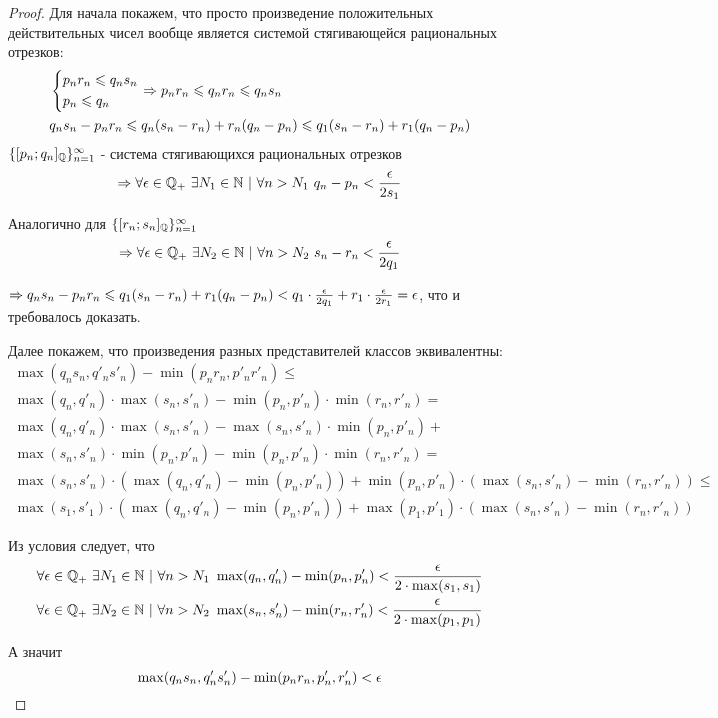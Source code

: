 \begin{proof}
    Для начала покажем, что просто произведение положительных действительных чисел вообще является системой стягивающейся рациональных отрезков:
    \begin{align*}
        &\left\{\begin{aligned}
        &p_n r_n \leqslant q_n s_n \\ 
        &p_n \leqslant q_n
        \end{aligned}\right. 
        \Rightarrow p_n r_n \leqslant q_n r_n \leqslant q_n s_n \\
        &q_n s_n - p_n r_n \leqslant q_n (s_n - r_n) + r_n (q_n - p_n) \leqslant q_1 (s_n - r_n) + r_1 (q_n - p_n)
    \end{align*}
    $\{[p_n; q_n]_{\mathbb{Q}}\}_{n = 1}^\infty$ - система стягивающихся рациональных отрезков
    $$
    \Ra \forall \veps \in \Q_+\ \exists N_1 \in \N\ |\ \forall n > N_1\ q_n - p_n < \frac{\veps}{2s_1}
    $$
    
    Аналогично для $\{[r_n; s_n]_{\mathbb{Q}}\}_{n = 1}^\infty$
    $$
    \Rightarrow \forall \epsilon \in \mathbb{Q}_+\ \exists N_2 \in \mathbb{N}\ |\ \forall n > N_2\ s_n - r_n < \frac{\epsilon}{2q_1}
    $$
    
    $\Rightarrow q_n s_n - p_n r_n \leqslant q_1 (s_n - r_n) + r_1 (q_n - p_n) < q_1 \cdot \frac{\epsilon}{2q_1} + r_1 \cdot \frac{\epsilon}{2r_1} = \epsilon$, что и требовалось доказать.
    
    Далее покажем, что произведения разных представителей классов эквивалентны:
    \begin{multline}
        \max(q_n s_n, q'_n s'_n) - \min(p_n r_n, p'_n r'_n) \le \\
        \max(q_n, q'_n) \cdot \max(s_n, s'_n) - \min(p_n, p'_n) \cdot \min(r_n, r'_n) = \\
        \max(q_n, q'_n) \cdot \max(s_n, s'_n) - \max(s_n, s'_n) \cdot \min(p_n, p'_n) + \\
        \max(s_n, s'_n) \cdot \min(p_n, p'_n) - \min(p_n, p'_n) \cdot \min(r_n, r'_n) = \\
        \max(s_n, s'_n) \cdot (\max(q_n, q'_n) - \min(p_n, p'_n)) + \min(p_n, p'_n) \cdot (\max(s_n, s'_n) - \min(r_n, r'_n)) \le \\
        \max(s_1, s'_1) \cdot (\max(q_n, q'_n) - \min(p_n, p'_n)) + \max(p_1, p'_1) \cdot (\max(s_n, s'_n) - \min(r_n, r'_n))
    \end{multline}
    
    Из условия следует, что
    \begin{align*}
        \forall \epsilon \in \mathbb{Q}_+\ \exists N_1 \in \mathbb{N}\ |\ \forall n > N_1\ \max(q_n, q'_n) - \min(p_n, p'_n) < \frac{\epsilon}{2 \cdot \max(s_1, s
        _1)}
        \\
        \forall \epsilon \in \mathbb{Q}_+\ \exists N_2 \in \mathbb{N}\ |\ \forall n > N_2\ \max(s_n, s'_n) - \min(r_n, r'_n) < \frac{\epsilon}{2 \cdot \max(p_1, p
        _1)}
    \end{align*}
    
    А значит
    $$
        \max(q_n s_n, q'_n s'_n) - \min(p_n r_n, p'_n, r'_n) < \epsilon
    $$
\end{proof}

